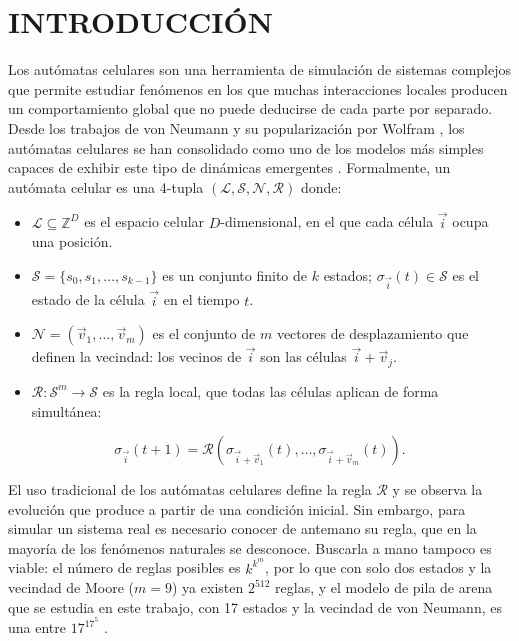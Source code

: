 \section{INTRODUCCIÓN}

Los autómatas celulares son una herramienta de simulación de sistemas complejos que permite estudiar fenómenos en los que muchas interacciones locales producen un comportamiento global que no puede deducirse de cada parte por separado. Desde los trabajos de von Neumann \cite{neumann1966_ca} y su popularización por Wolfram \cite{wolfram1982_ca}, los autómatas celulares se han consolidado como uno de los modelos más simples capaces de exhibir este tipo de dinámicas emergentes \cite{Hoekstra2010_cs_ca}. Formalmente, un autómata celular es una 4-tupla $(\mathcal{L}, \mathcal{S}, \mathcal{N}, \mathcal{R})$ \cite{weisstein2002_ca, ZenilMartinez2024} donde:

\begin{itemize}
	\item $\mathcal{L} \subseteq \mathbb{Z}^D$ es el espacio celular $D$-dimensional, en el que cada célula $\vec{i}$ ocupa una posición.
	\item $\mathcal{S} = \{s_0, s_1, \dots, s_{k-1}\}$ es un conjunto finito de $k$ estados; $\sigma_{\vec{i}}(t) \in \mathcal{S}$ es el estado de la célula $\vec{i}$ en el tiempo $t$.
	\item $\mathcal{N} = (\vec{v}_1, \dots, \vec{v}_m)$ es el conjunto de $m$ vectores de desplazamiento que definen la vecindad: los vecinos de $\vec{i}$ son las células $\vec{i} + \vec{v}_j$.
	\item $\mathcal{R} : \mathcal{S}^m \to \mathcal{S}$ es la regla local, que todas las células aplican de forma simultánea:
\end{itemize}
\begin{equation}
	\sigma_{\vec{i}}(t+1) = \mathcal{R}\left(\sigma_{\vec{i}+\vec{v}_1}(t), \dots, \sigma_{\vec{i}+\vec{v}_m}(t)\right).
	\label{eq:regla_local}
\end{equation}

El uso tradicional de los autómatas celulares define la regla $\mathcal{R}$ y se observa la evolución que produce a partir de una condición inicial. Sin embargo, para simular un sistema real es necesario conocer de antemano su regla, que en la mayoría de los fenómenos naturales se desconoce. Buscarla a mano tampoco es viable: el número de reglas posibles es $k^{k^m}$, por lo que con solo dos estados y la vecindad de Moore ($m = 9$) ya existen $2^{512}$ reglas, y el modelo de pila de arena que se estudia en este trabajo, con 17 estados y la vecindad de von Neumann, es una entre $17^{17^5}$ \cite{elYacoubi2021control}.

